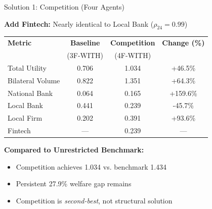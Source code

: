 \documentclass[aspectratio=169]{beamer}
\begin{document}
\begin{frame}{Solution 1: Competition (Four Agents)}
    
    \textbf{Add Fintech:} Nearly identical to Local Bank ($\rho_{24} = 0.99$)
    
    \vspace{0.3cm}
    \begin{table}
        \centering
        \small
        \begin{tabular}{lccc}
            \toprule
            \textbf{Metric} & \textbf{Baseline} & \textbf{Competition} & \textbf{Change (\%)} \\
            & (3F-WITH) & (4F-WITH) & \\
            \midrule
            Total Utility & 0.706 & 1.034 & \textcolor{SafeGreen}{+46.5\%} \\
            Bilateral Volume & 0.822 & 1.351 & +64.3\% \\
            \midrule
            National Bank & 0.064 & 0.165 & +159.6\% \\
            Local Bank & 0.441 & 0.239 & -45.7\% \\
            Local Firm & 0.202 & 0.391 & +93.6\% \\
            Fintech & --- & 0.239 & --- \\
            \bottomrule
        \end{tabular}
    \end{table}
    
    \vspace{0.2cm}
    \textbf{Compared to Unrestricted Benchmark:}
    \begin{itemize}
        \item Competition achieves 1.034 vs. benchmark 1.434
        \item \textcolor{AlertRed}{Persistent 27.9\% welfare gap remains}
        \item Competition is \textit{second-best}, not structural solution
    \end{itemize}

\end{frame}
\end{document}
